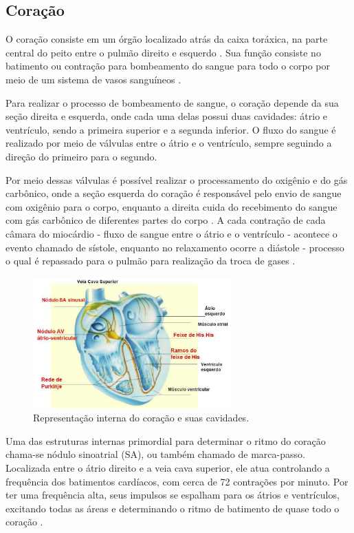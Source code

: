 \documentclass[conference]{IEEEtran}
\begin{document}
\subsection{Coração}

O coração consiste em um órgão localizado atrás da caixa toráxica, na parte central do peito entre o pulmão direito e esquerdo \cite{nih11}. Sua função consiste no batimento ou contração para bombeamento do sangue para todo o corpo por meio de um sistema de vasos sanguíneos \cite{gray79}.

Para realizar o processo de bombeamento de sangue, o coração depende da sua seção direita e esquerda, onde cada uma delas possui duas cavidades: átrio e ventrículo, sendo a primeira superior e a segunda inferior. O fluxo do sangue é realizado por meio de válvulas entre o átrio e o ventrículo, sempre seguindo a direção do primeiro para o segundo.

Por meio dessas válvulas é possível realizar o processamento do oxigênio e do gás carbônico, onde a seção esquerda do coração é responsável pelo envio de sangue com oxigênio para o corpo, enquanto a direita cuida do recebimento do sangue com gás carbônico de diferentes partes do corpo \cite{nih11}. A cada contração de cada câmara do miocárdio - fluxo de sangue entre o átrio e o ventrículo - acontece o evento chamado de sístole, enquanto no relaxamento ocorre a diástole - processo o qual é repassado para o pulmão para realização da troca de gases \cite{nih11}.

\begin{figure}[!h]
	\centering
	\includegraphics[width=3in]{img/coracaoEsquematico}
	\caption{Representação interna do coração e suas cavidades.}
	\label{coracaoEsquematico}
\end{figure}

Uma das estruturas internas primordial para determinar o ritmo do coração chama-se nódulo sinoatrial (SA), ou também chamado de marca-passo. Localizada entre o átrio direito e a veia cava superior, ele atua controlando a frequência dos batimentos cardíacos, com cerca de 72 contrações por minuto. Por ter uma frequência alta, seus impulsos se espalham para os átrios e ventrículos, excitando todas as áreas e determinando o ritmo de batimento de quase todo o coração  \cite{guyton06}.
\end{document}
